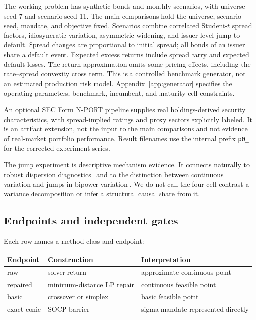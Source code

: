 \documentclass[11pt,a4paper]{article}
\begin{document}
The working problem has \MSixBonds{} synthetic bonds and
\MSixScenarios{} monthly scenarios, with universe seed 7 and scenario seed 11.
The main comparisons hold the universe, scenario seed, mandate, and objective
fixed. Scenarios combine correlated Student-$t$ spread factors, idiosyncratic
variation, asymmetric widening, and issuer-level jump-to-default. Spread
changes are proportional to initial spread; all bonds of an issuer share a
default event. Expected excess returns include spread carry and expected
default losses. The return approximation omits some pricing effects, including
the rate--spread convexity cross term. This is a controlled benchmark
generator, not an estimated production risk model.
Appendix~\ref{app:generator} specifies the operating parameters, benchmark,
incumbent, and maturity-cell constraints.

An optional SEC Form N-PORT pipeline supplies real holdings-derived security
characteristics, with spread-implied ratings and proxy sectors explicitly
labeled. It is an artifact extension, not the input to the main comparisons
and not evidence of real-market portfolio performance. Result filenames use
the internal prefix \texttt{p0\_} for the corrected experiment series.

The jump experiment is descriptive mechanism evidence. It connects naturally
to robust dispersion diagnostics~\citep{geary1935ratio} and to the distinction
between continuous variation and jumps in bipower variation
\citep{barndorff2004bipower}. We do not call the four-cell contrast a variance
decomposition or infer a structural causal share from it.

\subsection{Endpoints and independent gates}

Each row names a method class and endpoint:
\begin{center}
\begin{tabular}{lll}
\toprule
Endpoint & Construction & Interpretation\\
\midrule
raw & solver return & approximate continuous point\\
repaired & minimum-distance LP repair & continuous feasible point\\
basic & crossover or simplex & basic feasible point\\
exact-conic & SOCP barrier & sigma mandate represented directly\\
\bottomrule
\end{tabular}
\end{center}
\end{document}
